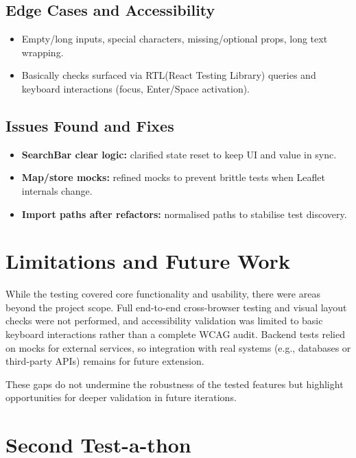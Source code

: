 \subsection{Edge Cases and Accessibility}
\begin{itemize}
    \item Empty/long inputs, special characters, missing/optional props, long text wrapping.
    \item Basically checks surfaced via RTL(React Testing Library) queries and keyboard interactions (focus, Enter/Space activation).
\end{itemize}

\subsection{Issues Found and Fixes}
\begin{itemize}
    \item \textbf{SearchBar clear logic:} clarified state reset to keep UI and value in sync.
    \item \textbf{Map/store mocks:} refined mocks to prevent brittle tests when Leaflet internals change.
    \item \textbf{Import paths after refactors:} normalised paths to stabilise test discovery.
\end{itemize}

\section{Limitations and Future Work}

While the testing covered core functionality and usability, there were areas beyond the project scope. 
Full end-to-end cross-browser testing and visual layout checks were not performed, and accessibility 
validation was limited to basic keyboard interactions rather than a complete WCAG audit. 
Backend tests relied on mocks for external services, so integration with real systems (e.g., databases or third-party APIs) 
remains for future extension. 

These gaps do not undermine the robustness of the tested features but highlight opportunities for deeper 
validation in future iterations.


\cleardoublepage
\section{Second Test-a-thon}
\label{sec:testathon-two}


